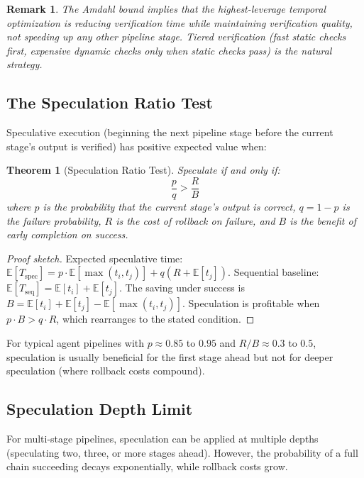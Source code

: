 \documentclass[11pt, a4paper, logo, copyright]{googledeepmind}
\newtheorem{theorem}{Theorem}[section]
\newtheorem*{remark}{Remark}
\begin{document}
\begin{remark}
The Amdahl bound implies that the highest-leverage temporal optimization is reducing verification time while maintaining verification quality, not speeding up any other pipeline stage. Tiered verification (fast static checks first, expensive dynamic checks only when static checks pass) is the natural strategy.
\end{remark}

\subsection{The Speculation Ratio Test}

Speculative execution (beginning the next pipeline stage before the current stage's output is verified) has positive expected value when:

\begin{theorem}[Speculation Ratio Test]
\label{thm:speculation}
Speculate if and only if:
\begin{equation}
    \frac{p}{q} > \frac{R}{B}
\end{equation}
where $p$ is the probability that the current stage's output is correct, $q = 1 - p$ is the failure probability, $R$ is the cost of rollback on failure, and $B$ is the benefit of early completion on success.
\end{theorem}

\begin{proof}[Proof sketch]
Expected speculative time: $\mathbb{E}[T_{\mathrm{spec}}] = p \cdot \mathbb{E}[\max(t_i, t_j)] + q(R + \mathbb{E}[t_j])$. Sequential baseline: $\mathbb{E}[T_{\mathrm{seq}}] = \mathbb{E}[t_i] + \mathbb{E}[t_j]$. The saving under success is $B = \mathbb{E}[t_i] + \mathbb{E}[t_j] - \mathbb{E}[\max(t_i, t_j)]$. Speculation is profitable when $p \cdot B > q \cdot R$, which rearranges to the stated condition.
\end{proof}

For typical agent pipelines with $p \approx 0.85$ to $0.95$ and $R/B \approx 0.3$ to $0.5$, speculation is usually beneficial for the first stage ahead but not for deeper speculation (where rollback costs compound).

\subsection{Speculation Depth Limit}

For multi-stage pipelines, speculation can be applied at multiple depths (speculating two, three, or more stages ahead). However, the probability of a full chain succeeding decays exponentially, while rollback costs grow.
\end{document}
